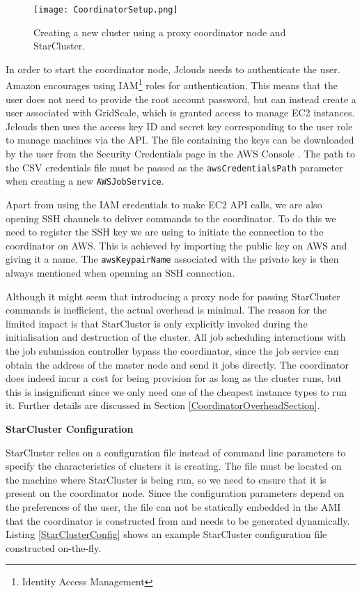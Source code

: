 \begin{figure}[h]
	\centering
		\texttt{[image: CoordinatorSetup.png]}
	\caption{Creating a new cluster using a proxy coordinator node and StarCluster.}
	\label{CoordinatorSetup}
\end{figure}

In order to start the coordinator node, Jclouds needs to authenticate the user. Amazon encourages using IAM\footnote{Identity Access Management} roles for authentication. This means that the user does not need to provide the root account password, but can instead create a user associated with GridScale, which is granted access to manage EC2 instances. Jclouds then uses the access key ID and secret key corresponding to the user role to manage machines via the API. The file containing the keys can be downloaded by the user from the Security Credentials page in the AWS Console \cite{AWSCredentials}. The path to the CSV credentials file must be passed as the \verb|awsCredentialsPath| parameter when creating a new \verb|AWSJobService|.

Apart from using the IAM credentials to make EC2 API calls, we are also opening SSH channels to deliver commands to the coordinator. To do this we need to register the SSH key we are using to initiate the connection to the coordinator on AWS. This is achieved by importing the public key on AWS and giving it a name. The \verb|awsKeypairName| associated with the private key is then always mentioned when openning an SSH connection.

Although it might seem that introducing a proxy node for passing StarCluster commands is inefficient, the actual overhead is minimal. The reason for the limited impact is that StarCluster is only explicitly invoked during the initialisation and destruction of the cluster. All job scheduling interactions with the job submission controller bypass the coordinator, since the job service can obtain the address of the master node and send it jobs directly. The coordinator does indeed incur a cost for being provision for as long as the cluster runs, but this is insignificant since we only need one of the cheapest instance types to run it. Further details are discussed in Section \ref{CoordinatorOverheadSection}.

\vspace{3mm}
\textbf{StarCluster Configuration}
\vspace{1mm}

StarCluster relies on a configuration file instead of command line parameters to specify the characteristics of clusters it is creating. The file must be located on the machine where StarCluster is being run, so we need to ensure that it is present on the coordinator node. Since the configuration parameters depend on the preferences of the user, the file can not be statically embedded in the AMI that the coordinator is constructed from and needs to be generated dynamically. Listing \ref{StarClusterConfig} shows an example StarCluster configuration file constructed on-the-fly.

